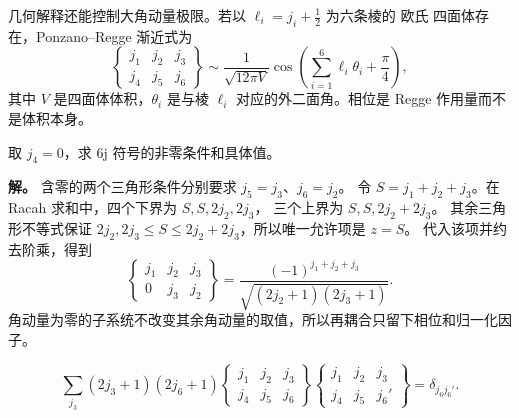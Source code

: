 \par\medskip
\par\medskip
几何解释还能控制大角动量极限。若以 $\ell_i=j_i+\tfrac12$ 为六条棱的 欧氏 四面体存在，Ponzano--Regge 渐近式为
\[
\begin{Bmatrix}j_1&j_2&j_3\\j_4&j_5&j_6\end{Bmatrix}
\sim\frac{1}{\sqrt{12\pi V}}
\cos\left(\sum_{i=1}^{6}\ell_i\theta_i+\frac{\pi}{4}\right),
\]
其中 $V$ 是四面体体积，$\theta_i$ 是与棱 $\ell_i$ 对应的外二面角。相位是 Regge 作用量而不是体积本身。
\begin{example}[{一个角动量为零的 6j 符号}]
取 $j_4=0$，求 6j 符号的非零条件和具体值。

\textbf{解。} 含零的两个三角形条件分别要求 $j_5=j_3$、$j_6=j_2$。
令 $S=j_1+j_2+j_3$。在 Racah 求和中，四个下界为 $S,S,2j_2,2j_3$，
三个上界为 $S,S,2j_2+2j_3$。
其余三角形不等式保证 $2j_2,2j_3\le S\le2j_2+2j_3$，所以唯一允许项是 $z=S$。
代入该项并约去阶乘，得到
\[
\begin{Bmatrix}j_1&j_2&j_3\\0&j_3&j_2\end{Bmatrix}
=\frac{(-1)^{j_1+j_2+j_3}}{\sqrt{(2j_2+1)(2j_3+1)}}.
\label{eq:6j-zero}
\]
角动量为零的子系统不改变其余角动量的取值，所以再耦合只留下相位和归一化因子。
\end{example}
\begin{proposition}[6j 符号正交关系]
\[
\sum_{j_3}(2j_3+1)(2j_6+1)
\begin{Bmatrix}j_1&j_2&j_3\\j_4&j_5&j_6\end{Bmatrix}
\begin{Bmatrix}j_1&j_2&j_3\\j_4&j_5&j_6'\end{Bmatrix}
=\delta_{j_6 j_6'}.
\]
\end{proposition}
\par\medskip
